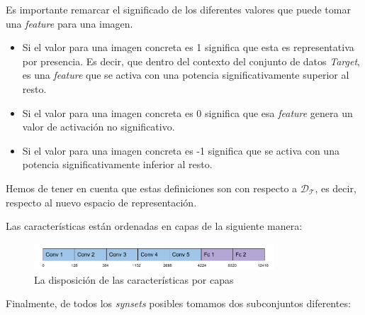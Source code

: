 \documentclass[12,twoside]{TFG-GM}
\theoremstyle{definition}
\theoremstyle{remark}
\begin{document}
Es importante remarcar el significado de los diferentes valores que puede tomar una \textit{feature} para una imagen.
\begin{itemize}
\item Si el valor para una imagen concreta es 1 significa que esta es representativa por presencia. Es decir, que dentro del contexto del conjunto de datos \textit{Target}, es una \textit{feature} que se activa con una potencia significativamente superior al resto.
\item Si el valor para una imagen concreta es 0 significa que esa \textit{feature} genera un valor de activación no significativo.
\item Si el valor para una imagen concreta es -1 significa que se activa con una potencia significativamente inferior al resto. 
\end{itemize}

Hemos de tener en cuenta que estas definiciones son con respecto a $\mathcal{D_T}$, es decir, respecto al nuevo espacio de representación.  

Las características están ordenadas en capas de la siguiente manera: 
\begin{figure}[H]
\label{}
\centering
\includegraphics[width = 0.8\textwidth]{Images/croplayer.png} 
\caption{La disposición de las características por capas \label{fig:featuresperlayer}}
\end{figure}


Finalmente, de todos los \textit{synsets} posibles tomamos dos subconjuntos diferentes: 
\end{document}
